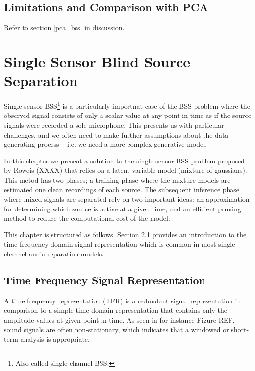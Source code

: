 \documentclass[11pt, oneside, a4paper]{report}
\begin{document}
\section{Limitations and Comparison with PCA}\label{ica_conclusions}

Refer to section \ref{pca_bss} in discussion.


\chapter{Single Sensor Blind Source Separation}\label{ssbss_chap}

Single sensor BSS\footnote{Also called single channel BSS.} is a
particularly importnat case of the BSS problem where the observed
signal consists of only a scalar value at any point in time as if the
source signals were recorded a sole microphone. This presents us with
particular challenges, and we often need to make further assumptions
about the data generating process -- i.e. we need a more complex
generative model.

In this chapter we present  a solution to the single sensor BSS
problem proposed by Roweis (XXXX)\cite{roweis} that relies on a
latent variable model (mixture of gaussians). This metod has two 
phases; a training phase where the mixture models are estimated
one clean recordings of each source. The subsequent inference 
phase where mixed signals are separated rely on two important ideas: an
approximation for determining which source is active at a given time,
and an efficient pruning method to reduce the computational cost
of the model.


This chapter is structured as follows. Section \ref{timeFreqRep}
provides an introduction to the time-frequency domain signal
representation which is common in most single channel audio separation
models. 



\section{Time Frequency Signal Representation}\label{timeFreqRep}


A time frequency representation (TFR) is a redundant signal
representation in comparison to a simple time domain representation that
contains only the amplitude values at given point in time. As seen in
for instance Figure REF, sound signals are often non-stationary,
which indicates that a windowed or short-term analysis is
appropriate. 
\end{document}
